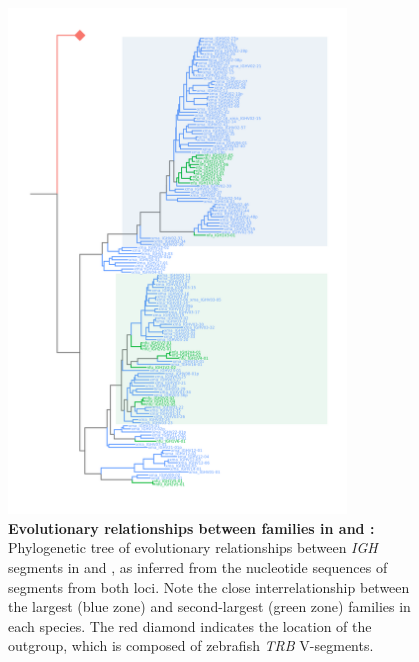 	\begin{figure}
	\centering
	\includegraphics[width=0.8\textwidth]{_Figures/png/nfu-xma-vh-tree-nt.png} %
	\caption[Evolutionary relationships between \vh families in \Xma and \Nfu]{\textbf{Evolutionary relationships between \vh families in \Xma and \Nfu:} Phylogenetic tree of evolutionary relationships between \textit{IGH} \vh segments in \Nfu and \Xma, as inferred from the nucleotide sequences of \vh segments from both loci. Note the close interrelationship between the largest (blue zone) and second-largest (green zone) families in each species. The red diamond indicates the location of the outgroup, which is composed of zebrafish \textit{TRB} V-segments.}
	\label{fig:nfu-xma-vh-tree-nt}
	\end{figure}
	
